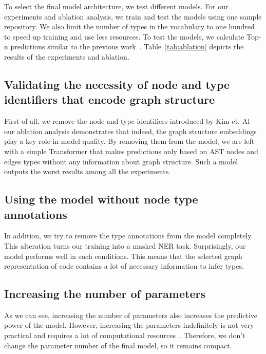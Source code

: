 To select the final model architecture, we test different models.
For our experiments and ablation analysis, we train and test the models using one sample repository.
We also limit the number of types in the vocabulary to one hundred to speed up training and use less resources.
To test the models, we calculate Top-n predictions similar to the previous work~\cite{mir_type4py_2021}.
Table~\ref{tab:ablation} depicts the results of the experiments and ablation.

\subsection{Validating the necessity of node and type identifiers that encode graph structure}\label{subsec:validating-the-necessity-of-node-and-type-identifiers-that-encode-graph-structure}

First of all, we remove the node and type identifiers introduced by Kim et. Al~\cite{kim_pure_2022} our ablation analysis demonstrates that indeed, the graph structure embeddings play a key role in model quality.
By removing them from the model, we are left with a simple Transformer that makes predictions only based on AST nodes and edges types without any information about graph structure.
Such a model outputs the worst results among all the experiments.

\subsection{Using the model without node type annotations}\label{subsec:using-the-model-without-node-type-annotations}

In addition, we try to remove the type annotations from the model completely.
This alteration turns our training into a masked NER task.
Surprisingly, our model performs well in such conditions.
This means that the selected graph representation of code contains a lot of necessary information to infer types.

\subsection{Increasing the number of parameters}\label{subsec:increasing-the-number-of-parameters}

As we can see, increasing the number of parameters also increases the predictive power of the model.
However, increasing the parameters indefinitely is not very practical and requires a lot of computational resources~\cite{arutyunov_big_2022}.
Therefore, we don't change the parameter number of the final model, so it remains compact.

